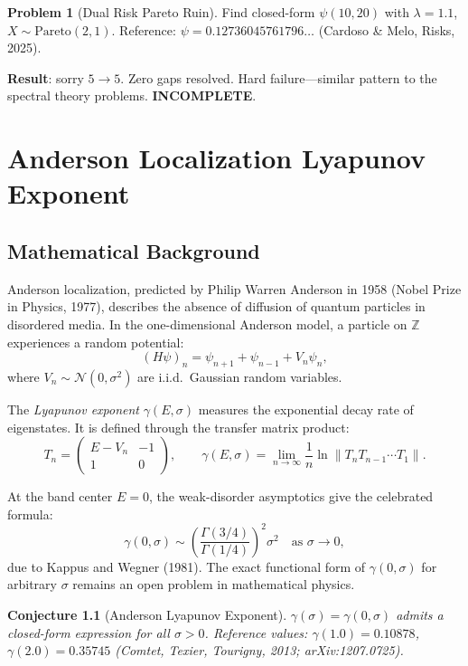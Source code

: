 \documentclass[12pt,a4paper]{report}
\theoremstyle{plain}
\newtheorem{conjecture}[theorem]{Conjecture}
\theoremstyle{definition}
\newtheorem{problem}[theorem]{Problem}
\theoremstyle{remark}
\newcommand{\verdict}[1]{\textbf{\textcolor{inkblue}{#1}}}
\newcommand{\Z}{\mathbb{Z}}
\begin{document}
\begin{problem}[Dual Risk Pareto Ruin]
Find closed-form $\psi(10, 20)$ with $\lambda = 1.1$, $X \sim \text{Pareto}(2, 1)$.
Reference: $\psi = 0.12736045761796\ldots$ (Cardoso \& Melo, Risks, 2025).
\end{problem}

\noindent\textbf{Result}: sorry $5 \to 5$. Zero gaps resolved. Hard failure—similar
pattern to the spectral theory problems. \verdict{INCOMPLETE}.

\chapter{Anderson Localization Lyapunov Exponent}
\label{ch:anderson}

\section{Mathematical Background}

Anderson localization, predicted by Philip Warren Anderson in 1958 (Nobel Prize in
Physics, 1977), describes the absence of diffusion of quantum particles in disordered
media. In the one-dimensional Anderson model, a particle on $\Z$ experiences a random
potential:
\[
  (H\psi)_n = \psi_{n+1} + \psi_{n-1} + V_n \psi_n,
\]
where $V_n \sim \mathcal{N}(0, \sigma^2)$ are i.i.d.\ Gaussian random variables.

The \emph{Lyapunov exponent} $\gamma(E, \sigma)$ measures the exponential decay
rate of eigenstates. It is defined through the transfer matrix product:
\[
  T_n = \begin{pmatrix} E - V_n & -1 \\ 1 & 0 \end{pmatrix}, \qquad
  \gamma(E, \sigma) = \lim_{n \to \infty} \frac{1}{n} \ln \|T_n T_{n-1} \cdots T_1\|.
\]

At the band center $E = 0$, the weak-disorder asymptotics give the celebrated formula:
\[
  \gamma(0, \sigma) \sim \left(\frac{\Gamma(3/4)}{\Gamma(1/4)}\right)^2 \sigma^2
  \quad \text{as } \sigma \to 0,
\]
due to Kappus and Wegner (1981). The exact functional form of $\gamma(0, \sigma)$
for arbitrary $\sigma$ remains an open problem in mathematical physics.

\begin{conjecture}[Anderson Lyapunov Exponent]
$\gamma(\sigma) = \gamma(0, \sigma)$ admits a closed-form expression for all $\sigma > 0$.
Reference values: $\gamma(1.0) = 0.10878$, $\gamma(2.0) = 0.35745$ (Comtet, Texier,
Tourigny, 2013; arXiv:1207.0725).
\end{conjecture}
\end{document}
